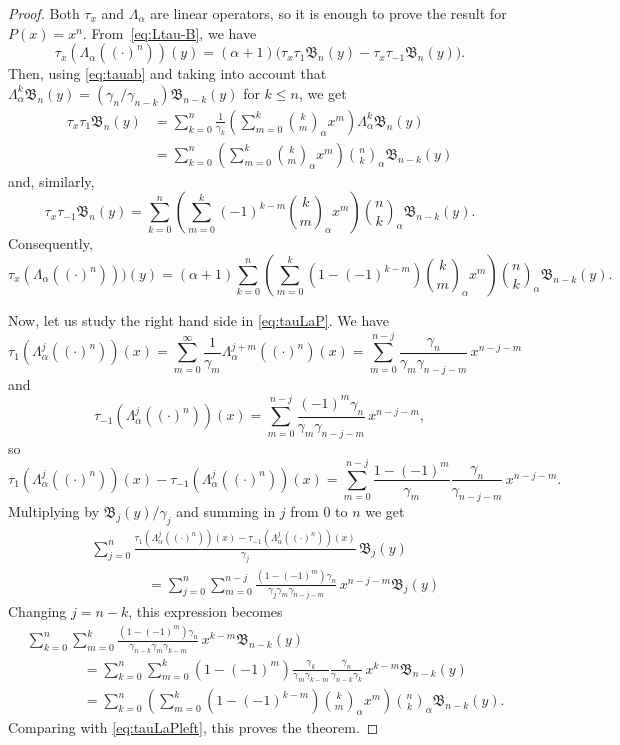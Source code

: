 \documentclass[10pt]{article}
\theoremstyle{plain}
\theoremstyle{definition}
\numberwithin{equation}{section} %
\newcommand{\La}{\Lambda_{\alpha}}
\newcommand{\binoma}[2]{\binom{#1}{#2}_{\!\alpha}}
\newcommand{\B}{\mathfrak{B}}
\newcommand{\cc}{\gamma}
\begin{document}
\begin{proof}
Both $\tau_x$ and $\La$ are linear operators, so it is enough to prove the result for $P(x) = x^n$.
From~\eqref{eq:Ltau-B}, we have
\[
  \tau_x (\La((\cdot)^n))(y)
  = (\alpha+1) \big(\tau_x \tau_1 \B_n(y) - \tau_x \tau_{-1} \B_n(y)\big).
\]
Then, using \eqref{eq:tauab} and taking into account that $\La^k \B_n(y) = (\cc_n/\cc_{n-k}) \B_{n-k}(y)$ for $k \le n$, we get
\begin{align*}
  \tau_x \tau_1 \B_n (y) 
  &= \sum_{k=0}^{n} \frac{1}{\cc_{k}} 
  \left( \sum_{m=0}^k \binoma{k}{m} x^m \right) \La^k \B_n(y) \\
  &= \sum_{k=0}^{n} \left( \sum_{m=0}^k \binoma{k}{m} x^m \right) \binoma{n}{k} \B_{n-k}(y)
\end{align*}
and, similarly,
\[
  \tau_x \tau_{-1} \B_n (y) 
  = \sum_{k=0}^{n} \left( \sum_{m=0}^k (-1)^{k-m} \binoma{k}{m} x^m \right) \binoma{n}{k} \B_{n-k}(y).
\]
Consequently,
\begin{equation}
\label{eq:tauLaPleft}
  \tau_x (\La((\cdot)^n)))(y)
  = (\alpha+1) \sum_{k=0}^{n} \left( \sum_{m=0}^k (1-(-1)^{k-m}) \binoma{k}{m} x^m \right) 
  \binoma{n}{k} \B_{n-k}(y).
\end{equation}

Now, let us study the right hand side in \eqref{eq:tauLaP}. We have 
\[
  \tau_1(\La^j ((\cdot)^n))(x) = \sum_{m=0}^{\infty} \frac{1}{\cc_m} \La^{j+m} ((\cdot)^n)(x) 
  = \sum_{m=0}^{n-j} \frac{\cc_n}{\cc_m\cc_{n-j-m}} \,x^{n-j-m}
\]
and
\[
  \tau_{-1}(\La^j ((\cdot)^n))(x) = \sum_{m=0}^{n-j} \frac{(-1)^m\cc_n}{\cc_m\cc_{n-j-m}} \,x^{n-j-m},
\]
so
\[
  \tau_1(\La^j ((\cdot)^n))(x) - \tau_{-1}(\La^j ((\cdot)^n))(x) 
  = \sum_{m=0}^{n-j} \frac{1-(-1)^m}{\cc_m} \frac{\cc_n}{\cc_{n-j-m}} \,x^{n-j-m}.
\]
Multiplying by $\B_j(y)/\cc_j$ and summing in $j$ from $0$ to $n$ we get 
\begin{align*}
  &\sum_{j=0}^{n} \frac{\tau_1(\La^j ((\cdot)^n))(x) - \tau_{-1} (\La^j ((\cdot)^n))(x)}{\cc_j} \, \B_j(y) \\
  &\qquad\qquad = \sum_{j=0}^{n} \sum_{m=0}^{n-j} \frac{(1-(-1)^m)\cc_n}{\cc_j\cc_m\cc_{n-j-m}} \, x^{n-j-m} \B_j(y) 
\end{align*}
Changing $j=n-k$, this expression becomes 
\begin{align*}
  &\sum_{k=0}^{n} \sum_{m=0}^{k} \frac{(1-(-1)^m)\cc_n}{\cc_{n-k}\cc_m\cc_{k-m}} \, x^{k-m} \B_{n-k}(y) \\
  &\qquad\qquad = \sum_{k=0}^{n} \sum_{m=0}^{k} (1-(-1)^m) 
  \frac{\cc_k}{\cc_m\cc_{k-m}} \frac{\cc_n}{\cc_{n-k}\cc_k} \, x^{k-m} \B_{n-k}(y) \\
  &\qquad\qquad= \sum_{k=0}^{n} \left( \sum_{m=0}^{k} (1-(-1)^{k-m}) 
  \binoma{k}{m} x^m \right) \binoma{n}{k} \B_{n-k}(y).
\end{align*}
Comparing with \eqref{eq:tauLaPleft}, this proves the theorem.
\end{proof}
\end{document}

